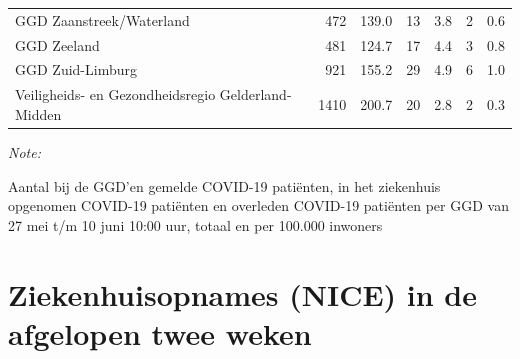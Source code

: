 \documentclass[
  english,
  man,floatsintext]{apa6}
\begin{document}
\begin{table}
\begin{threeparttable}
\begin{tabular}{lrrrrrr}
GGD Zaanstreek/Waterland & 472 & 139.0 & 13 & 3.8 & 2 & 0.6\\
GGD Zeeland & 481 & 124.7 & 17 & 4.4 & 3 & 0.8\\
GGD Zuid-Limburg & 921 & 155.2 & 29 & 4.9 & 6 & 1.0\\
Veiligheids- en Gezondheidsregio Gelderland-Midden & 1410 & 200.7 & 20 & 2.8 & 2 & 0.3\\
\bottomrule
\end{tabular}
\begin{tablenotes}
\item \textit{Note: } 
\item Aantal bij de GGD’en gemelde COVID-19 patiënten, in het ziekenhuis opgenomen COVID-19 patiënten en overleden COVID-19 patiënten per GGD van 27 mei t/m 10 juni 10:00 uur, totaal en per 100.000 inwoners
\end{tablenotes}
\end{threeparttable}
\endgroup{}
\end{table}

\newpage

\hypertarget{ziekenhuisopnames-nice-in-de-afgelopen-twee-weken}{%
\section{Ziekenhuisopnames (NICE) in de afgelopen twee weken}\label{ziekenhuisopnames-nice-in-de-afgelopen-twee-weken}}
\end{document}
